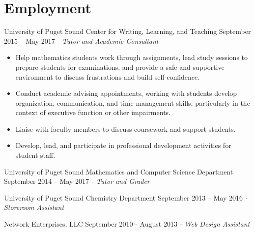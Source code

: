 \section{Employment}
University of Puget Sound Center for Writing, Learning, and Teaching \hfill September 2015 – May 2017 \newline
\textit{ - Tutor and Academic Consultant}  \\
 \vspace{-4.5mm}
 \begin{itemize}
 \item Help mathematics students work through assignments, lead study sessions to prepare students for examinations, and provide a safe and supportive environment to discuss frustrations and build self-confidence.
 \item Conduct academic advising appointments, working with students develop organization, communication, and time-management skills, particularly in the context of executive function or other impairments.
 \item Liaise with faculty members to discuss coursework and support students.
 \item Develop, lead, and participate in professional development activities for student staff.
 \end{itemize}
\vspace{-3.5mm}
University of Puget Sound Mathematics and Computer Science Department \hfill  September 2014 – May 2017 \newline
\textit{- Tutor and Grader} \\
  \vspace{-4.5mm}
    \vspace{-3.5mm}
    
University of Puget Sound Chemistry Department \hfill September 2013 – May 2016 \newline
\textit{- Storeroom Assistant} \\
  \vspace{-4.5mm}
    \vspace{-3.5mm}

Network Enterprises, LLC \hfill September 2010 - August 2013 \newline
\textit{- Web Design Assistant} \hfill
    \vspace{-3.5mm}
